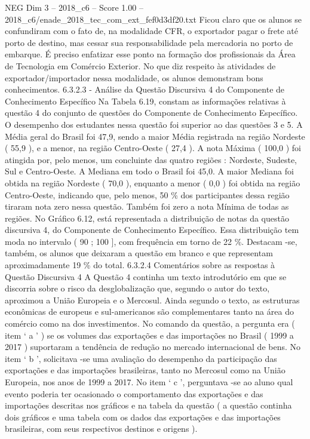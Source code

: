 \begin{textsample}{NEG Dim 3 – 2018\_c6 – Score 1.00 – 2018\_c6/enade\_2018\_tec\_com\_ext\_fef0d3df20.txt}
Ficou claro que os alunos se confundiram com o fato de, na modalidade CFR, o exportador pagar o frete até porto de destino, mas cessar sua responsabilidade pela mercadoria no porto de embarque.
É preciso enfatizar esse ponto na formação dos profissionais da Área de Tecnologia em Comércio Exterior.
No que diz respeito às atividades de exportador/importador nessa modalidade, os alunos demonstram bons conhecimentos. 6.3.2.3 - Análise da Questão Discursiva 4 do Componente de Conhecimento Específico Na Tabela 6.19, constam as informações relativas à questão 4 do conjunto de questões do Componente de Conhecimento Específico.
O desempenho dos estudantes nessa questão foi superior ao das questões 3 e 5.
A Média geral do Brasil foi 47,9, sendo a maior Média registrada na região Nordeste ( 55,9 ), e a menor, na região Centro-Oeste ( 27,4 ).
A nota Máxima ( 100,0 ) foi atingida por, pelo menos, um concluinte das quatro regiões : Nordeste, Sudeste, Sul e Centro-Oeste.
A Mediana em todo o Brasil foi 45,0.
A maior Mediana foi obtida na região Nordeste ( 70,0 ), enquanto a menor ( 0,0 ) foi obtida na região Centro-Oeste, indicando que, pelo menos, 50 \% dos participantes dessa região tiraram nota zero nessa questão.
Também foi zero a nota Mínima de todas as regiões.
No Gráfico 6.12, está representada a distribuição de notas da questão discursiva 4, do Componente de Conhecimento Específico.
Essa distribuição tem moda no intervalo ( 90 ; 100 ], com frequência em torno de 22 \%.
Destacam -se, também, os alunos que deixaram a questão em branco e que representam aproximadamente 19 \% do total. 6.3.2.4 Comentários sobre as respostas à Questão Discursiva 4 A Questão 4 continha um texto introdutório em que se discorria sobre o risco da desglobalização que, segundo o autor do texto, aproximou a União Europeia e o Mercosul.
Ainda segundo o texto, as estruturas econômicas de europeus e sul-americanos são complementares tanto na área do comércio como na dos investimentos.
No comando da questão, a pergunta era ( item ‘ a ’ ) se os volumes das exportações e das importações no Brasil ( 1999 a 2017 ) suportaram a tendência de redução no mercado internacional de bens.
No item ‘ b ’, solicitava -se uma avaliação do desempenho da participação das exportações e das importações brasileiras, tanto no Mercosul como na União Europeia, nos anos de 1999 a 2017.
No item ‘ c ’, perguntava -se ao aluno qual evento poderia ter ocasionado o comportamento das exportações e das importações descritas nos gráficos e na tabela da questão ( a questão continha dois gráficos e uma tabela com os dados das exportações e das importações brasileiras, com seus respectivos destinos e origens ).

\end{textsample}
